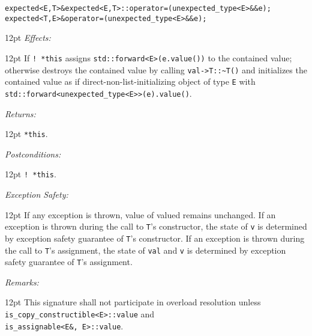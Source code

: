 \documentclass[a4paper,10pt]{article}
\newcommand{\cpp}[1]{\lstinline{#1}}
\newcommand{\wordingItem}[1]{\noindent\textit{#1:}}
\newenvironment{wordingTextItem}[1]{\wordingItem{#1}\vspace{2pt}\noindent\begin{adjustwidth}{12pt}{}}{\vspace{2pt}\end{adjustwidth}}
\newenvironment{wordingPara}{\begin{adjustwidth}{12pt}{}}{\end{adjustwidth}}
\newcommand{\suppress}[1]{\colorbox{suppress_color}{#1}}
\newcommand{\update}[1]{\colorbox{update_color}{#1}}
\begin{document}
\begin{alltt}
\suppress{expected<E,T>& expected<E,T>::operator=(unexpected_type<E>&& e); }
\update{expected<T,E>& operator=(unexpected_type<E>&& e); }
\end{alltt}
\begin{wordingPara}
\begin{wordingTextItem}{Effects}
If \cpp{! *this} assigns \cpp{std::forward<E>(e.value())} to the contained value; otherwise destroys the contained value by calling \cpp{val->T::~T()} and initializes the contained value as if direct-non-list-initializing object of type \cpp{E} with \cpp{std::forward<unexpected_type<E>>(e).value()}.
\end{wordingTextItem}
\begin{wordingTextItem}{Returns}
\cpp{*this}.
\end{wordingTextItem}
\begin{wordingTextItem}{Postconditions}
\cpp{! *this}.
\end{wordingTextItem}
\begin{wordingTextItem}{Exception Safety}
If any exception is thrown, value of valued remains unchanged. If an exception is thrown during the call to \cpp{T}'s constructor, the state of \cpp{v} is determined by exception safety guarantee of \cpp{T}'s constructor. If an exception is thrown during the call to \cpp{T}'s assignment, the state of \cpp{val} and \cpp{v} is determined by exception safety guarantee of \cpp{T}'s assignment.
\end{wordingTextItem}
\begin{wordingTextItem}{Remarks}
This signature shall not participate in overload resolution unless\\
\cpp{is_copy_constructible<E>::value} and \\
\cpp{is_assignable<E&, E>::value}.
\end{wordingTextItem}
\end{wordingPara}
\end{document}
